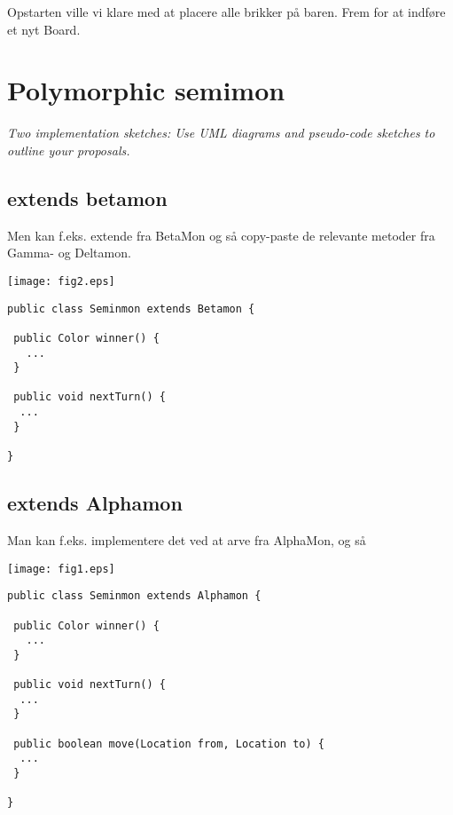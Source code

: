 \documentclass[a4paper]{article}
\begin{document}
Opstarten ville vi klare med at placere alle brikker på baren. Frem
for at indføre et nyt Board.


\newpage
\section{Polymorphic semimon}
\textit{Two implementation sketches: Use UML diagrams and pseudo-code 
sketches to outline your proposals.} \\

\subsection{extends betamon}


Men kan f.eks. extende fra BetaMon og så copy-paste de relevante
metoder fra Gamma- og Deltamon.


\begin{center}
\texttt{[image: fig2.eps]}
\end{center} 

\begin{verbatim}
public class Seminmon extends Betamon {

 public Color winner() {
   ...
 }

 public void nextTurn() {
  ...
 }

}
\end{verbatim}



\newpage

\subsection{extends Alphamon}

Man kan f.eks. implementere det ved at arve fra AlphaMon, og så

\begin{center}
  \texttt{[image: fig1.eps]}
\end{center}



\begin{verbatim}
public class Seminmon extends Alphamon {

 public Color winner() {
   ...
 }

 public void nextTurn() {
  ...
 }

 public boolean move(Location from, Location to) {
  ...
 }

}
\end{verbatim}
\end{document}
